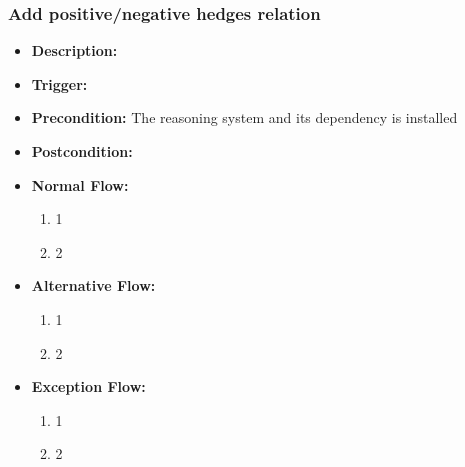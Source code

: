 \documentclass[../gr-final.tex]{subfiles}
\begin{document}
\subsubsection{Add positive/negative hedges relation}
\begin{itemize}
  \item {\bfseries Description:} 
  \item {\bfseries Trigger:}
  \item {\bfseries Precondition:} The reasoning system and its
    dependency is installed
    
  \item {\bfseries Postcondition:}

  \item {\bfseries Normal Flow:}
    \begin{enumerate}
      \item 1
      \item 2
    \end{enumerate}
  \item {\bfseries Alternative Flow:}
    \begin{enumerate}
      \item 1
      \item 2
    \end{enumerate}
  \item {\bfseries Exception Flow:}
    \begin{enumerate}
      \item 1
      \item 2
    \end{enumerate}
\end{itemize}
\end{document}
